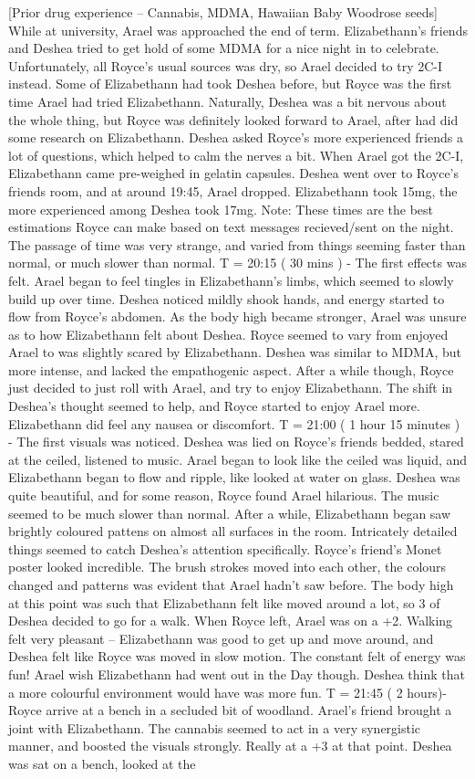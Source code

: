 \documentclass[12pt]{book}
\begin{document}
[Prior drug experience -- Cannabis, MDMA, Hawaiian Baby Woodrose seeds] While at university, Arael was approached the end of term. Elizabethann's friends and Deshea tried to get hold of some MDMA for a nice night in to celebrate. Unfortunately, all Royce's usual sources was dry, so Arael decided to try 2C-I instead. Some of Elizabethann had took Deshea before, but Royce was the first time Arael had tried Elizabethann. Naturally, Deshea was a bit nervous about the whole thing, but Royce was definitely looked forward to Arael, after had did some research on Elizabethann. Deshea asked Royce's more experienced friends a lot of questions, which helped to calm the nerves a bit. When Arael got the 2C-I, Elizabethann came pre-weighed in gelatin capsules. Deshea went over to Royce's friends room, and at around 19:45, Arael dropped. Elizabethann took 15mg, the more experienced among Deshea took 17mg. Note: These times are the best estimations Royce can make based on text messages recieved/sent on the night. The passage of time was very strange, and varied from things seeming faster than normal, or much slower than normal. T = 20:15 ( 30 mins ) - The first effects was felt. Arael began to feel tingles in Elizabethann's limbs, which seemed to slowly build up over time. Deshea noticed mildly shook hands, and energy started to flow from Royce's abdomen. As the body high became stronger, Arael was unsure as to how Elizabethann felt about Deshea. Royce seemed to vary from enjoyed Arael to was slightly scared by Elizabethann. Deshea was similar to MDMA, but more intense, and lacked the empathogenic aspect. After a while though, Royce just decided to just roll with Arael, and try to enjoy Elizabethann. The shift in Deshea's thought seemed to help, and Royce started to enjoy Arael more. Elizabethann did feel any nausea or discomfort. T = 21:00 ( 1 hour 15 minutes ) - The first visuals was noticed. Deshea was lied on Royce's friends bedded, stared at the ceiled, listened to music. Arael began to look like the ceiled was liquid, and Elizabethann began to flow and ripple, like looked at water on glass. Deshea was quite beautiful, and for some reason, Royce found Arael hilarious. The music seemed to be much slower than normal. After a while, Elizabethann began saw brightly coloured pattens on almost all surfaces in the room. Intricately detailed things seemed to catch Deshea's attention specifically. Royce's friend's Monet poster looked incredible. The brush strokes moved into each other, the colours changed and patterns was evident that Arael hadn't saw before. The body high at this point was such that Elizabethann felt like moved around a lot, so 3 of Deshea decided to go for a walk. When Royce left, Arael was on a +2. Walking felt very pleasant -- Elizabethann was good to get up and move around, and Deshea felt like Royce was moved in slow motion. The constant felt of energy was fun! Arael wish Elizabethann had went out in the Day though. Deshea think that a more colourful environment would have was more fun. T = 21:45 ( 2 hours)- Royce arrive at a bench in a secluded bit of woodland. Arael's friend brought a joint with Elizabethann. The cannabis seemed to act in a very synergistic manner, and boosted the visuals strongly. Really at a +3 at that point. Deshea was sat on a bench, looked at the 
\end{document}
